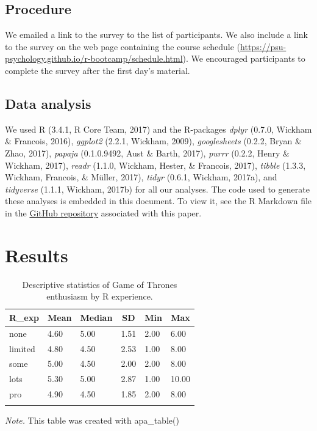\documentclass[english,man]{apa6}
\theoremstyle{definition}
\theoremstyle{definition}
\theoremstyle{remark}
\begin{document}
\subsection{Procedure}\label{procedure}

We emailed a link to the survey to the list of participants. We also
include a link to the survey on the web page containing the course
schedule
(\url{https://psu-psychology.github.io/r-bootcamp/schedule.html}). We
encouraged participants to complete the survey after the first day's
material.

\subsection{Data analysis}\label{data-analysis}

We used R (3.4.1, R Core Team, 2017) and the R-packages \emph{dplyr}
(0.7.0, Wickham \& Francois, 2016), \emph{ggplot2} (2.2.1, Wickham,
2009), \emph{googlesheets} (0.2.2, Bryan \& Zhao, 2017), \emph{papaja}
(0.1.0.9492, Aust \& Barth, 2017), \emph{purrr} (0.2.2, Henry \&
Wickham, 2017), \emph{readr} (1.1.0, Wickham, Hester, \& Francois,
2017), \emph{tibble} (1.3.3, Wickham, Francois, \& Müller, 2017),
\emph{tidyr} (0.6.1, Wickham, 2017a), and \emph{tidyverse} (1.1.1,
Wickham, 2017b) for all our analyses. The code used to generate these
analyses is embedded in this document. To view it, see the R Markdown
file in the
\href{http://github.com/psu-psychology/r-bootcamp/papaja-demo/}{GitHub
repository} associated with this paper.

\section{Results}\label{results}

\begin{table}[tbp]
\begin{center}
\begin{threeparttable}
\caption{\label{tab:GoT-by-experience}Descriptive statistics of Game of Thrones enthusiasm by R experience.}
\begin{tabular}{llllll}
\toprule
R\_exp & \multicolumn{1}{c}{Mean} & \multicolumn{1}{c}{Median} & \multicolumn{1}{c}{SD} & \multicolumn{1}{c}{Min} & \multicolumn{1}{c}{Max}\\
\midrule
none & 4.60 & 5.00 & 1.51 & 2.00 & 6.00\\
limited & 4.80 & 4.50 & 2.53 & 1.00 & 8.00\\
some & 5.00 & 4.50 & 2.00 & 2.00 & 8.00\\
lots & 5.30 & 5.00 & 2.87 & 1.00 & 10.00\\
pro & 4.90 & 4.50 & 1.85 & 2.00 & 8.00\\
\bottomrule
\addlinespace
\end{tabular}
\begin{tablenotes}[para]
\textit{Note.} This table was created with apa\_table()
\end{tablenotes}
\end{threeparttable}
\end{center}
\end{table}
\end{document}
